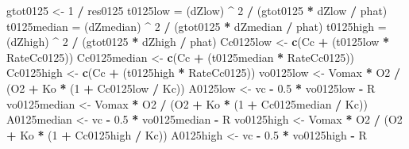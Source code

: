 \documentclass[
]{krantz}
\makeatletter
\newenvironment{Shaded}{\begin{snugshade}}{\end{snugshade}}
\newcommand{\DecValTok}[1]{\textcolor[rgb]{0.00,0.00,0.81}{#1}}
\newcommand{\FloatTok}[1]{\textcolor[rgb]{0.00,0.00,0.81}{#1}}
\newcommand{\KeywordTok}[1]{\textcolor[rgb]{0.13,0.29,0.53}{\textbf{#1}}}
\newcommand{\NormalTok}[1]{#1}
\newcommand{\OperatorTok}[1]{\textcolor[rgb]{0.81,0.36,0.00}{\textbf{#1}}}
\newcommand{\StringTok}[1]{\textcolor[rgb]{0.31,0.60,0.02}{#1}}
\newenvironment{kframe}{%
\medskip{}
\setlength{\fboxsep}{.8em}
 \def\at@end@of@kframe{}%
 \ifinner\ifhmode%
  \def\at@end@of@kframe{\end{minipage}}%
  \begin{minipage}{\columnwidth}%
 \fi\fi%
 \def\FrameCommand##1{\hskip\@totalleftmargin \hskip-\fboxsep
 \colorbox{shadecolor}{##1}\hskip-\fboxsep
     \hskip-\linewidth \hskip-\@totalleftmargin \hskip\columnwidth}%
 \MakeFramed {\advance\hsize-\width
   \@totalleftmargin\z@ \linewidth\hsize
   \@setminipage}}%
 {\par\unskip\endMakeFramed%
 \at@end@of@kframe}
\renewenvironment{Shaded}{\begin{kframe}}{\end{kframe}}
\makeatother
\begin{document}
\begin{Shaded}
\begin{Highlighting}[]
\NormalTok{gtot0125 \textless{}{-}}\StringTok{ }\DecValTok{1} \OperatorTok{/}\StringTok{ }\NormalTok{res0125}
\NormalTok{t0125low =}\StringTok{ }\NormalTok{(dZlow) }\OperatorTok{\^{}}\StringTok{ }\DecValTok{2} \OperatorTok{/}\StringTok{ }\NormalTok{(gtot0125 }\OperatorTok{*}\StringTok{ }\NormalTok{dZlow }\OperatorTok{/}\StringTok{ }\NormalTok{phat)}
\NormalTok{t0125median =}\StringTok{ }\NormalTok{(dZmedian) }\OperatorTok{\^{}}\StringTok{ }\DecValTok{2} \OperatorTok{/}\StringTok{ }\NormalTok{(gtot0125 }\OperatorTok{*}\StringTok{ }\NormalTok{dZmedian }\OperatorTok{/}\StringTok{ }\NormalTok{phat)}
\NormalTok{t0125high =}\StringTok{ }\NormalTok{(dZhigh) }\OperatorTok{\^{}}\StringTok{ }\DecValTok{2} \OperatorTok{/}\StringTok{ }\NormalTok{(gtot0125 }\OperatorTok{*}\StringTok{ }\NormalTok{dZhigh }\OperatorTok{/}\StringTok{ }\NormalTok{phat)}
\NormalTok{Cc0125low \textless{}{-}}\StringTok{ }\KeywordTok{c}\NormalTok{(Cc }\OperatorTok{+}\StringTok{ }\NormalTok{(t0125low }\OperatorTok{*}\StringTok{ }\NormalTok{RateCc0125))}
\NormalTok{Cc0125median \textless{}{-}}\StringTok{ }\KeywordTok{c}\NormalTok{(Cc }\OperatorTok{+}\StringTok{ }\NormalTok{(t0125median }\OperatorTok{*}\StringTok{ }\NormalTok{RateCc0125))}
\NormalTok{Cc0125high \textless{}{-}}\StringTok{ }\KeywordTok{c}\NormalTok{(Cc }\OperatorTok{+}\StringTok{ }\NormalTok{(t0125high }\OperatorTok{*}\StringTok{ }\NormalTok{RateCc0125))}
\NormalTok{vo0125low \textless{}{-}}\StringTok{ }\NormalTok{Vomax }\OperatorTok{*}\StringTok{ }\NormalTok{O2 }\OperatorTok{/}\StringTok{ }\NormalTok{(O2 }\OperatorTok{+}\StringTok{ }\NormalTok{Ko }\OperatorTok{*}\StringTok{ }\NormalTok{(}\DecValTok{1} \OperatorTok{+}\StringTok{ }\NormalTok{Cc0125low }\OperatorTok{/}\StringTok{ }\NormalTok{Kc)) }
\NormalTok{A0125low \textless{}{-}}\StringTok{ }\NormalTok{vc }\OperatorTok{{-}}\StringTok{ }\FloatTok{0.5} \OperatorTok{*}\StringTok{ }\NormalTok{vo0125low }\OperatorTok{{-}}\StringTok{ }\NormalTok{R }
\NormalTok{vo0125median \textless{}{-}}\StringTok{ }\NormalTok{Vomax }\OperatorTok{*}\StringTok{ }\NormalTok{O2 }\OperatorTok{/}\StringTok{ }\NormalTok{(O2 }\OperatorTok{+}\StringTok{ }\NormalTok{Ko }\OperatorTok{*}\StringTok{ }\NormalTok{(}\DecValTok{1} \OperatorTok{+}\StringTok{ }\NormalTok{Cc0125median }\OperatorTok{/}\StringTok{ }\NormalTok{Kc)) }
\NormalTok{A0125median \textless{}{-}}\StringTok{ }\NormalTok{vc }\OperatorTok{{-}}\StringTok{ }\FloatTok{0.5} \OperatorTok{*}\StringTok{ }\NormalTok{vo0125median }\OperatorTok{{-}}\StringTok{ }\NormalTok{R }
\NormalTok{vo0125high \textless{}{-}}\StringTok{ }\NormalTok{Vomax }\OperatorTok{*}\StringTok{ }\NormalTok{O2 }\OperatorTok{/}\StringTok{ }\NormalTok{(O2 }\OperatorTok{+}\StringTok{ }\NormalTok{Ko }\OperatorTok{*}\StringTok{ }\NormalTok{(}\DecValTok{1} \OperatorTok{+}\StringTok{ }\NormalTok{Cc0125high }\OperatorTok{/}\StringTok{ }\NormalTok{Kc)) }
\NormalTok{A0125high \textless{}{-}}\StringTok{ }\NormalTok{vc }\OperatorTok{{-}}\StringTok{ }\FloatTok{0.5} \OperatorTok{*}\StringTok{ }\NormalTok{vo0125high }\OperatorTok{{-}}\StringTok{ }\NormalTok{R }


\end{Highlighting}
\end{Shaded}
\end{document}

